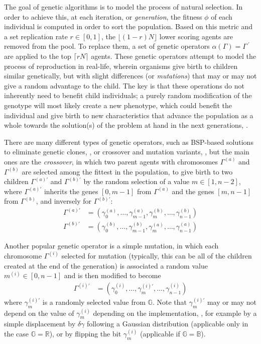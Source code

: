 \documentclass[aps,reprint,superscriptaddress,nofootinbib]{revtex4-2}
\begin{document}
The goal of genetic algorithms is to model the process of natural selection. In order to achieve this, at each iteration, or \textit{generation}, the fitness \(\phi\) of each individual is computed in order to sort the population. Based on this metric and a set replication rate \(r \in [0,1]\), the \(\lfloor(1-r)N\rfloor\) lower scoring agents are removed from the pool. To replace them, a set of genetic operators \(\alpha(\Gamma) = \Gamma^{~\prime}\) are applied to the top \(\lceil rN\rceil\) agents. These genetic operators attempt to model the process of reproduction in real-life, wherein organisms give birth to children similar genetically, but with slight differences (or \textit{mutations}) that may or may not give a random advantage to the child. The key is that these operations do not inherently need to benefit child individuals; a purely random modification of the genotype will most likely create a new phenotype, which could benefit the individual and give birth to new characteristics that advance the population as a whole towards the solution(s) of the problem at hand in the next generations, \cite{genotype_phenotype}.

There are many different types of genetic operators, such as BSP-based solutions to eliminate genetic clones, \cite{non_revisiting_ga}, or crossover and mutation variants, \cite{ga}, but the main ones are the \textit{crossover}, in which two parent agents with chromosomes \(\Gamma^{(a)}\) and \(\Gamma^{(b)}\) are selected among the fittest in the population, to give birth to two children \(\Gamma^{(a)\prime}\) and \(\Gamma^{(b)\prime}\) by the random selection of a value \(m \in [1, n-2]\), where \(\Gamma^{(a)\prime}\) inherits the genes \([0,m-1]\) from \(\Gamma^{(a)}\) and the genes \([m,n-1]\) from \(\Gamma^{(b)}\), and inversely for \(\Gamma^{(b)\prime}\):
\begin{align*}
    \Gamma^{(a)\prime} &= \left(\gamma_0^{(a)}, \ldots, \gamma_{m-1}^{(a)}, \gamma_{m}^{(b)}, \ldots, \gamma_{n-1}^{(b)}\right)
    \\
    \Gamma^{(b)\prime} &= \left(\gamma_0^{(b)}, \ldots, \gamma_{m-1}^{(b)}, \gamma_{m}^{(a)}, \ldots, \gamma_{n-1}^{(a)}\right)
\end{align*}

Another popular genetic operator is a simple mutation, in which each chromosome \(\Gamma^{(i)}\) selected for mutation (typically, this can be all of the children created at the end of the generation) is associated a random value \(m^{(i)} \in [0, n-1]\) and is then modified to become
\begin{align*}
    \Gamma^{(i)\prime} &= \left(\gamma_0^{(i)}, \ldots, \gamma_m^{(i)\prime}, \ldots, \gamma_{n-1}^{(i)}\right)
\end{align*}
where \(\gamma_m^{(i)\prime}\) is a randomly selected value from \(\mathbb{G}\). Note that \(\gamma_m^{(i)\prime}\) may or may not depend on the value of \(\gamma_m^{(i)}\) depending on the implementation, \cite{ga}, for example by a simple displacement by \(\delta\gamma\) following a Gaussian distribution (applicable only in the case \(\mathbb{G} = \mathbb{R}\)), or by flipping the bit \(\gamma_m^{(i)}\) (applicable if \(\mathbb{G} = \mathbb{B}\)).
\end{document}

